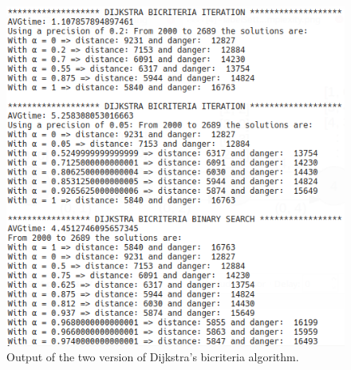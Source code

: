 \documentclass[a4paper,11pt]{report}
\begin{document}
\begin{figure}[h]
	\centering
	\includegraphics[width=\linewidth]{img/biCriteriaOutput.png}
	\caption{Output of the two version of Dijkstra's bicriteria algorithm.}
	\label{fig:dijkstraBiCriteriaSimple}
\end{figure}
\end{document}
